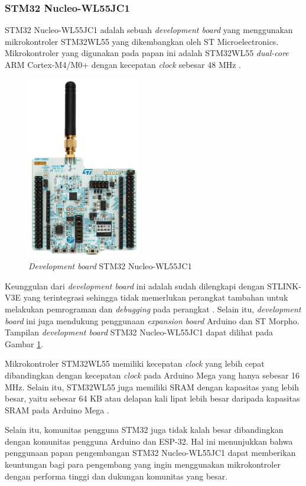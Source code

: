 \subsubsection{STM32 Nucleo-WL55JC1}
STM32 Nucleo-WL55JC1 adalah sebuah \textit{development board} yang menggunakan mikrokontroler STM32WL55 yang dikembangkan oleh ST Microelectronics. Mikrokontroler yang digunakan pada papan ini adalah STM32WL55 \textit{dual-core} ARM Cortex-M4/M0+ dengan kecepatan \textit{clock} sebesar 48 MHz \cite{STMicroelectronics2022}.

\begin{figure}[H]
	\centering
	\includegraphics[width=5cm]{contents/chapter-2/stm32-wl55jc1.jpg}
	\caption{\textit{Development board} STM32 Nucleo-WL55JC1}
	\label{Fig: STM32 Nucleo-WL55JC1}
\end{figure}

Keunggulan dari \textit{development board} ini adalah sudah dilengkapi dengan STLINK-V3E yang terintegrasi sehingga tidak memerlukan perangkat tambahan untuk melakukan pemrograman dan \textit{debugging} pada perangkat \cite{STMicroelectronics2022}. Selain itu, \textit{development board} ini juga mendukung penggunaan \textit{expansion board} Arduino dan ST Morpho. Tampilan \textit{development board} STM32 Nucleo-WL55JC1 dapat dilihat pada Gambar \ref{Fig: STM32 Nucleo-WL55JC1}.

Mikrokontroler STM32WL55 memiliki kecepatan \textit{clock} yang lebih cepat dibandingkan dengan kecepatan \textit{clock} pada Arduino Mega yang hanya sebesar 16 MHz. Selain itu, STM32WL55 juga memiliki SRAM dengan kapasitas yang lebih besar, yaitu sebesar 64 KB atau delapan kali lipat lebih besar daripada kapasitas SRAM pada Arduino Mega \cite{STMicroelectronics2022b}.

Selain itu, komunitas pengguna STM32 juga tidak kalah besar dibandingkan dengan komunitas pengguna Arduino dan ESP-32. Hal ini menunjukkan bahwa penggunaan papan pengembangan STM32 Nucleo-WL55JC1 dapat memberikan keuntungan bagi para pengembang yang ingin menggunakan mikrokontroler dengan performa tinggi dan dukungan komunitas yang besar.

